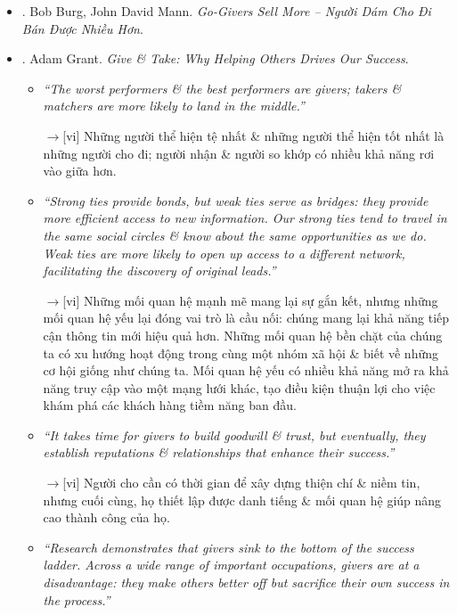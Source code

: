 \documentclass[12pt,oneside]{book}
\begin{document}
\begin{itemize}
	\item \cite{Burg_Mann_giver_VN}. {\sc Bob Burg, John David Mann}. {\it Go-Givers Sell More -- Người Dám Cho Đi Bán Được Nhiều Hơn}.
	\item \cite{Grant_give_take}. {\sc Adam Grant}. {\it Give \& Take: Why Helping Others Drives Our Success}.
	\begin{itemize}
		\item {\it``The worst performers \& the best performers are givers; takers \& matchers are more likely to land in the middle.''}
		
		{\sf[en]$\to$[vi]} Những người thể hiện tệ nhất \& những người thể hiện tốt nhất là những người cho đi; người nhận \& người so khớp có nhiều khả năng rơi vào giữa hơn.
		
		\item {\it``Strong ties provide bonds, but weak ties serve as bridges: they provide more efficient access to new information. Our strong ties tend to travel in the same social circles \& know about the same opportunities as we do. Weak ties are more likely to open up access to a different network, facilitating the discovery of original leads.''}
		
		{\sf[en]$\to$[vi]} Những mối quan hệ mạnh mẽ mang lại sự gắn kết, nhưng những mối quan hệ yếu lại đóng vai trò là cầu nối: chúng mang lại khả năng tiếp cận thông tin mới hiệu quả hơn. Những mối quan hệ bền chặt của chúng ta có xu hướng hoạt động trong cùng một nhóm xã hội \& biết về những cơ hội giống như chúng ta. Mối quan hệ yếu có nhiều khả năng mở ra khả năng truy cập vào một mạng lưới khác, tạo điều kiện thuận lợi cho việc khám phá các khách hàng tiềm năng ban đầu.
		
		\item {\it``It takes time for givers to build goodwill \& trust, but eventually, they establish reputations \& relationships that enhance their success.''}
		
		{\sf[en]$\to$[vi]} Người cho cần có thời gian để xây dựng thiện chí \& niềm tin, nhưng cuối cùng, họ thiết lập được danh tiếng \& mối quan hệ giúp nâng cao thành công của họ.		
		
		\item {\it``Research demonstrates that givers sink to the bottom of the success ladder. Across a wide range of important occupations, givers are at a disadvantage: they make others better off but sacrifice their own success in the process.''}
		

\end{itemize}
\end{itemize}
\end{document}
